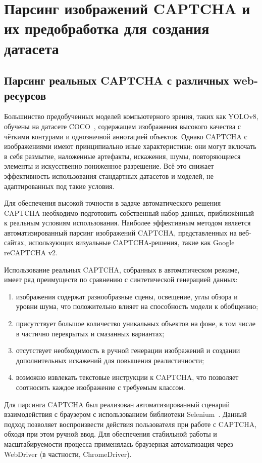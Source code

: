 \chapter{Парсинг изображений CAPTCHA и их предобработка для создания датасета}

\section{Парсинг реальных CAPTCHA с различных web-ресурсов}

Большинство предобученных моделей компьютерного зрения, таких как YOLOv8, обучены на датасете COCO~\cite{COCO}, содержащем изображения высокого качества с чёткими контурами и однозначной аннотацией объектов. Однако CAPTCHA с изображениями имеют принципиально иные характеристики: они могут включать в себя размытие, наложенные артефакты, искажения, шумы, повторяющиеся элементы и искусственно пониженное разрешение. Всё это снижает эффективность использования стандартных датасетов и моделей, не адаптированных под такие условия.

Для обеспечения высокой точности в задаче автоматического решения CAPTCHA необходимо подготовить собственный набор данных, приближённый к реальным условиям использования. Наиболее эффективным методом является автоматизированный парсинг изображений CAPTCHA, представленных на веб-сайтах, использующих визуальные CAPTCHA-решения, такие как Google reCAPTCHA v2.

Использование реальных CAPTCHA, собранных в автоматическом режиме, имеет ряд преимуществ по сравнению с синтетической генерацией данных:

\begin{enumerate}
    \item изображения содержат разнообразные сцены, освещение, углы обзора и уровни шума, что положительно влияет на способность модели к обобщению;
    \item присутствует большое количество уникальных объектов на фоне, в том числе в частично перекрытых и смазанных вариантах;
    \item отсутствует необходимость в ручной генерации изображений и создании дополнительных искажений для повышения реалистичности;
    \item возможно извлекать текстовые инструкции к CAPTCHA, что позволяет соотносить каждое изображение с требуемым классом.
\end{enumerate}

Для парсинга CAPTCHA был реализован автоматизированный сценарий взаимодействия с браузером с использованием библиотеки Selenium~\cite{Selenium}. Данный подход позволяет воспроизвести действия пользователя при работе с CAPTCHA, обходя при этом ручной ввод. Для обеспечения стабильной работы и масштабируемости процесса применялась браузерная автоматизация через WebDriver (в частности, ChromeDriver).


